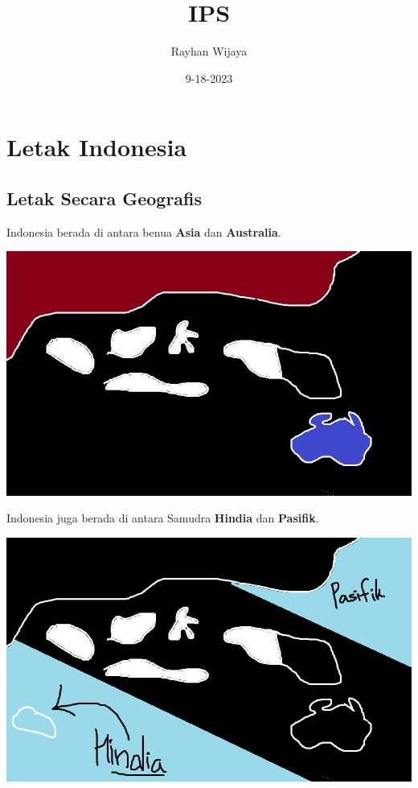 \documentclass[12pt]{report}
\title{IPS}
\author{Rayhan Wijaya}
\date{9-18-2023}
\begin{document}
\maketitle

\section*{Letak Indonesia}

\subsection*{Letak Secara Geografis}

Indonesia berada di antara benua \textbf{Asia} dan \textbf{Australia}.

\includegraphics[scale=0.63]{indonesia-asia-australia}

Indonesia juga berada di antara Samudra \textbf{Hindia} dan \textbf{Pasifik}.

\includegraphics[scale=0.63]{indonesia-hindia-pasifik}
\end{document}
